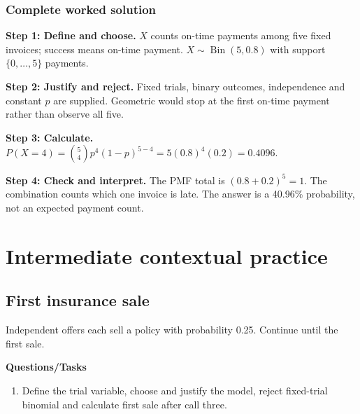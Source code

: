 \subsubsection*{Complete worked solution}
\par\noindent\begin{minipage}{\linewidth}
\textbf{Step 1: Define and choose.} $X$ counts on-time payments among five fixed invoices; success means on-time payment. $X\sim\operatorname{Bin}(5,0.8)$ with support $\{0,\ldots,5\}$ payments.
\end{minipage}\par\medskip
\par\noindent\begin{minipage}{\linewidth}
\textbf{Step 2: Justify and reject.} Fixed trials, binary outcomes, independence and constant $p$ are supplied. Geometric would stop at the first on-time payment rather than observe all five.
\end{minipage}\par\medskip
\par\noindent\begin{minipage}{\linewidth}
\textbf{Step 3: Calculate.} $P(X=4)=\binom54p^4(1-p)^{5-4}=5(0.8)^4(0.2)=0.4096$.
\end{minipage}\par\medskip
\par\noindent\begin{minipage}{\linewidth}
\textbf{Step 4: Check and interpret.} The PMF total is $(0.8+0.2)^5=1$. The combination counts which one invoice is late. The answer is a 40.96\% probability, not an expected payment count.
\end{minipage}\par\medskip
{}
\section{Intermediate contextual practice}\label{sec:t2-c9-intermediate}
\subsection{First insurance sale}
Independent offers each sell a policy with probability 0.25. Continue until the first sale.

\textbf{Questions/Tasks}
\begin{enumerate}
\item Define the trial variable, choose and justify the model, reject fixed-trial binomial and calculate first sale after call three.
\end{enumerate}
